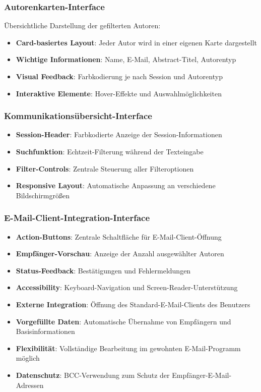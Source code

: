 \documentclass[11pt,a4paper]{article}
\begin{document}
\subsubsection{Autorenkarten-Interface}
Übersichtliche Darstellung der gefilterten Autoren:
\begin{itemize}
    \item \textbf{Card-basiertes Layout}: Jeder Autor wird in einer eigenen Karte dargestellt
    \item \textbf{Wichtige Informationen}: Name, E-Mail, Abstract-Titel, Autorentyp
    \item \textbf{Visual Feedback}: Farbkodierung je nach Session und Autorentyp
    \item \textbf{Interaktive Elemente}: Hover-Effekte und Auswahlmöglichkeiten
\end{itemize}

\subsubsection{Kommunikationsübersicht-Interface}
\begin{itemize}
    \item \textbf{Session-Header}: Farbkodierte Anzeige der Session-Informationen
    \item \textbf{Suchfunktion}: Echtzeit-Filterung während der Texteingabe
    \item \textbf{Filter-Controls}: Zentrale Steuerung aller Filteroptionen
    \item \textbf{Responsive Layout}: Automatische Anpassung an verschiedene Bildschirmgrößen
\end{itemize}

\subsubsection{E-Mail-Client-Integration-Interface}
\begin{itemize}
    \item \textbf{Action-Buttons}: Zentrale Schaltfläche für E-Mail-Client-Öffnung
    \item \textbf{Empfänger-Vorschau}: Anzeige der Anzahl ausgewählter Autoren
    \item \textbf{Status-Feedback}: Bestätigungen und Fehlermeldungen
    \item \textbf{Accessibility}: Keyboard-Navigation und Screen-Reader-Unterstützung
\end{itemize}
\begin{itemize}
    \item \textbf{Externe Integration}: Öffnung des Standard-E-Mail-Clients des Benutzers
    \item \textbf{Vorgefüllte Daten}: Automatische Übernahme von Empfängern und Basisinformationen
    \item \textbf{Flexibilität}: Vollständige Bearbeitung im gewohnten E-Mail-Programm möglich
    \item \textbf{Datenschutz}: BCC-Verwendung zum Schutz der Empfänger-E-Mail-Adressen
\end{itemize}
\end{document}
